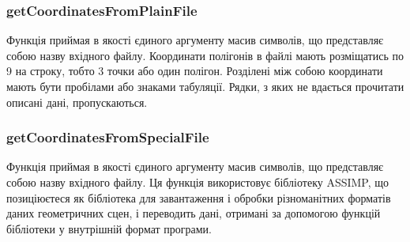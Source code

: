\documentclass[a4paper,12pt]{article}
\begin{document}
\subsubsection{getCoordinatesFromPlainFile}
Функція приймая в якості єдиного аргументу масив символів, що представляє собою назву вхідного файлу. Координати полігонів в файлі мають розміщатись по 9 на строку, тобто 3 точки або один полігон. Розділені між собою координати мають бути пробілами або знаками табуляції. Рядки, з яких не вдається прочитати описані дані, пропускаються.

\subsubsection{getCoordinatesFromSpecialFile}
Функція приймая в якості єдиного аргументу масив символів, що представляє собою назву вхідного файлу. Ця функція використовує бібліотеку ASSIMP, що позиціюєтеся як бібліотека для завантаження і обробки різноманітних форматів даних геометричних сцен, і переводить дані, отримані за допомогою функцій бібліотеки у внутрішній формат програми.
\end{document}
